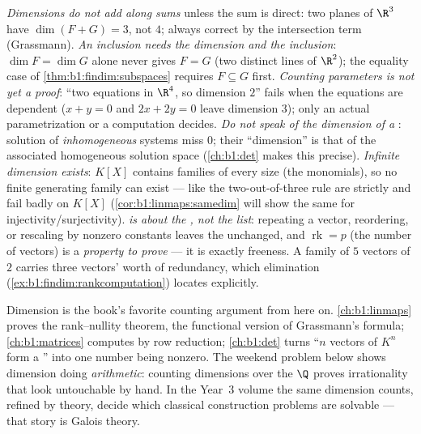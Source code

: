 \begin{remark}
\label{rem:b1:findim:pitfalls}
\emph{Dimensions do not add along sums} unless the sum is direct:
two planes of $\R^3$ have $\dim(F + G) = 3$, not $4$; always
correct by the intersection term (Grassmann).
\emph{An inclusion needs the dimension \emph{and} the inclusion}:
$\dim F = \dim G$ alone never gives $F = G$ (two distinct lines
of $\R^2$); the equality case of
\cref{thm:b1:findim:subspaces} requires $F \subseteq G$ first.
\emph{Counting parameters is not yet a proof}: ``two equations in
$\R^4$, so dimension $2$'' fails when the equations are
dependent ($x + y = 0$ and $2x + 2y = 0$ leave dimension $3$);
only an actual parametrization or a  computation decides.
\emph{Do not speak of the dimension of a }: solution
 of \emph{inhomogeneous} systems miss $0$; their ``dimension''
is that of the associated homogeneous solution space
(\cref{ch:b1:det} makes this precise).
\emph{Infinite dimension exists}: $K[X]$ contains  families
of every size (the monomials), so no finite generating family
can exist ---  like the two-out-of-three rule are
strictly  and fail badly on $K[X]$
(\cref{cor:b1:linmaps:samedim} will show the same for
injectivity/surjectivity).
\emph{ is about the , not the list}: repeating a vector,
reordering, or rescaling by nonzero constants leaves the 
unchanged, and $\operatorname{rk} = p$ (the number of vectors)
is a \emph{property to prove} --- it is exactly freeness. A
family of $5$ vectors of  $2$ carries three vectors' worth
of redundancy, which elimination
(\cref{ex:b1:findim:rankcomputation}) locates explicitly.
\end{remark}

\begin{remark}
\label{rem:b1:findim:whereused}
Dimension is the book's favorite counting argument from here on.
\cref{ch:b1:linmaps} proves the rank--nullity theorem, the
functional version of Grassmann's formula; \cref{ch:b1:matrices}
computes  by row reduction; \cref{ch:b1:det} turns ``$n$
vectors of $K^n$ form a '' into one number being nonzero. The
weekend problem below shows dimension doing \emph{arithmetic}:
counting dimensions over the  $\Q$ proves irrationality
 that look untouchable by hand. In the Year~3 volume the
same dimension counts, refined by  theory, decide which
classical construction problems are solvable --- that story is
Galois theory.
\end{remark}

